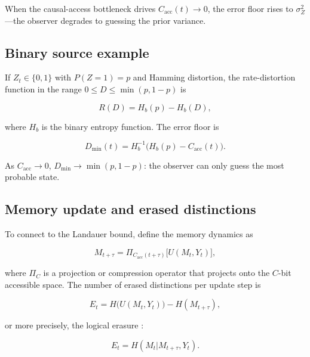 \documentclass[10pt,a4paper,twocolumn,aps,prl]{revtex4-2}
\begin{document}
When the causal-access bottleneck drives $C_{\mathrm{acc}}(t)\to0$, the error floor rises to $\sigma_Z^2$---the observer degrades to guessing the prior variance.

\subsection{Binary source example}

If $Z_t\in\{0,1\}$ with $P(Z=1)=p$ and Hamming distortion, the rate-distortion function in the range $0\leq D\leq\min(p,1-p)$ is

\begin{equation}
R(D)=H_b(p)-H_b(D),
\label{eq:binary-rd}
\end{equation}

where $H_b$ is the binary entropy function. The error floor is

\begin{equation}
D_{\min}(t)
=
H_b^{-1}\bigl(H_b(p)-C_{\mathrm{acc}}(t)\bigr).
\label{eq:binary-floor}
\end{equation}

As $C_{\mathrm{acc}}\to0$, $D_{\min}\to\min(p,1-p)$: the observer can only guess the most probable state.

\subsection{Memory update and erased distinctions}

To connect to the Landauer bound, define the memory dynamics as

\begin{equation}
M_{t+\tau}
=
\Pi_{C_{\mathrm{acc}}(t+\tau)}
\bigl[
U(M_t,Y_t)
\bigr],
\label{eq:memory-dynamics}
\end{equation}

where $\Pi_C$ is a projection or compression operator that projects onto the $C$-bit accessible space. The number of erased distinctions per update step is

\begin{equation}
E_t
=
H\bigl(U(M_t,Y_t)\bigr)
-
H(M_{t+\tau}),
\label{eq:erased-bits}
\end{equation}

or more precisely, the logical erasure \cite{wufdsagency2026}:

\begin{equation}
E_t
=
H(M_t|M_{t+\tau},Y_t).
\label{eq:erased-conditional}
\end{equation}
\end{document}
